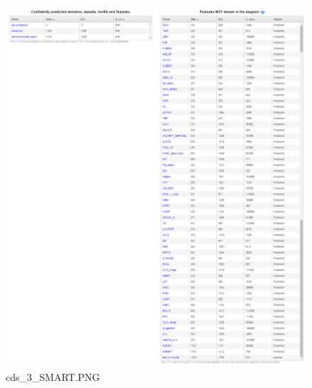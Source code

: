 \documentclass[supercite]{HustGraduPaper}
\begin{document}
	\begin{figure}[H]
		\centering
		\includegraphics[width=1\textwidth]{./material/practice2/cds_3/SMART.png}
		\caption{cds\_3\_SMART.PNG}
	\end{figure}
\end{document}
